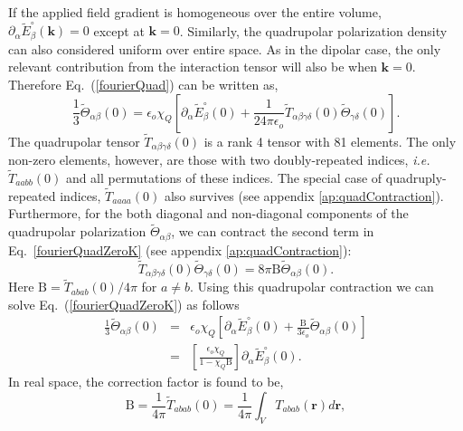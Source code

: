 If the applied field gradient is homogeneous over the entire volume,
${\partial_ \alpha \tilde{E}^\circ_\beta}(\mathbf{k}) = 0 $ except at
$ \mathbf{k} = 0$. Similarly, the quadrupolar polarization density can
also considered uniform over entire space. As in the dipolar case,
\cite{NeumannI83} the only relevant contribution from the interaction
tensor will also be when $\mathbf{k} = 0$. Therefore Eq.~(\ref{fourierQuad}) can be written as,
\begin{equation}
\frac{1}{3}\tilde{\Theta}_{\alpha\beta}(\mathrm{0})=
\epsilon_o {\chi}_Q \left[{\partial_\alpha
    \tilde{E}^\circ_\beta}(\mathrm{0})+ \frac{1}{24\pi
    \epsilon_o} \tilde{T}_{\alpha\beta\gamma\delta}(\mathrm{0})
 \tilde{\Theta}_{\gamma\delta}(\mathrm{0})\right].
\label{fourierQuadZeroK}
\end{equation} 
The quadrupolar tensor
$\tilde{T}_{\alpha\beta\gamma\delta}(\mathrm{0})$ is a rank 4 tensor
with 81 elements. The only non-zero elements, however, are those with
two doubly-repeated indices, \textit{i.e.}
$\tilde{T}_{aabb}(\mathrm{0})$ and all permutations of these indices.
The special case of quadruply-repeated indices,
$\tilde{T}_{aaaa}(\mathrm{0})$ also survives (see appendix
\ref{ap:quadContraction}). Furthermore, for the both diagonal and
non-diagonal components of the quadrupolar polarization
$\tilde{\Theta}_{\alpha\beta}$, we can contract the second term in
Eq.~\ref{fourierQuadZeroK} (see appendix
\ref{ap:quadContraction}):
\begin{equation}
\tilde{T}_{\alpha\beta\gamma\delta}(\mathrm{0})\tilde{\Theta}_{\gamma\delta}(\mathrm{0})=
8 \pi \mathrm{B} \tilde{\Theta}_{\alpha\beta}(\mathrm{0}).
\label{quadContraction}
\end{equation}
Here $\mathrm{B} = \tilde{T}_{abab}(\mathrm{0}) / 4 \pi$ for
$a \neq b$.  Using this quadrupolar contraction we can solve Eq.~(\ref{fourierQuadZeroK}) as follows
\begin{eqnarray}
\frac{1}{3}\tilde{\Theta}_{\alpha\beta}(\mathrm{0}) &=& \epsilon_o
                                                      {\chi}_Q
                                                      \left[{\partial_\alpha
                                                      \tilde{E}^\circ_\beta}(\mathrm{0})+
                                                      \frac{\mathrm{B}}{3
                                                      \epsilon_o} 
                                                      {\tilde{\Theta}}_{\alpha\beta}(\mathrm{0})\right]
                                                      \nonumber \\                                                    
&=& \left[\frac{\epsilon_o {\chi}_Q} {1-{\chi}_Q \mathrm{B}}\right]
{\partial_\alpha \tilde{E}^\circ_\beta}(\mathrm{0}).
\label{fourierQuad2}
\end{eqnarray}
In real space, the correction factor is found to be,
\begin{equation}
\mathrm{B} = \frac{1}{4 \pi} \tilde{T}_{abab}(0) = \frac{1}{4 \pi} \int_V {T}_{abab}(\mathbf{r}) d\mathbf{r},
\end{equation}

